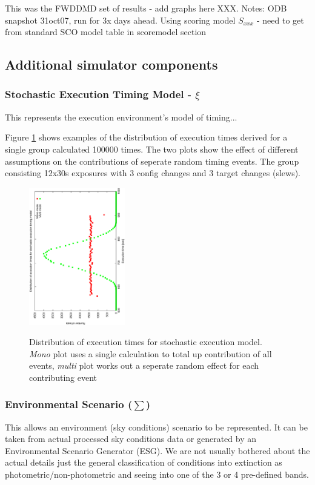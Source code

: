 This was the FWDDMD set of results - add graphs here XXX. Notes: ODB snapshot 31oct07, run for 3x days ahead. Using scoring model $S_{xxx}$ - need to get from standard SCO model table in scoremodel section

\subsection{Additional simulator components}

\subsubsection{Stochastic Execution Timing Model - $\xi$}
This represents the execution environment's model of timing...

Figure \ref{fig:simf_exec_timing_dist} shows examples of the distribution of execution times derived for a single group calculated 100000 times. The two plots show the effect of different assumptions on the contributions of seperate random timing events. The group consisting 12x30s exposures with 3 config changes and 3 target changes (slews).

\begin{figure}[h]
\begin{center}
 \label{fig:simf_exec_timing_dist}
  \includegraphics[height=6cm, angle=-90]{figures/simf_exec_plot.eps}
\caption[Distribution of execution times for stochastic execution model]
{Distribution of execution times for stochastic execution model. \emph{Mono} plot uses a single calculation to total up contribution of all events, \emph{multi} plot works out a seperate random effect for each contributing event}
\end{center}
\end{figure}

\subsubsection{Environmental Scenario ($\sum$)}
This allows an environment (sky conditions) scenario to be represented. It can be taken from actual processed sky conditions data or generated by an Environmental Scenario Generator (ESG). We are not usually bothered about the actual details just the general classification of conditions into extinction as photometric/non-photometric and seeing into one of the 3 or 4 pre-defined bands.


